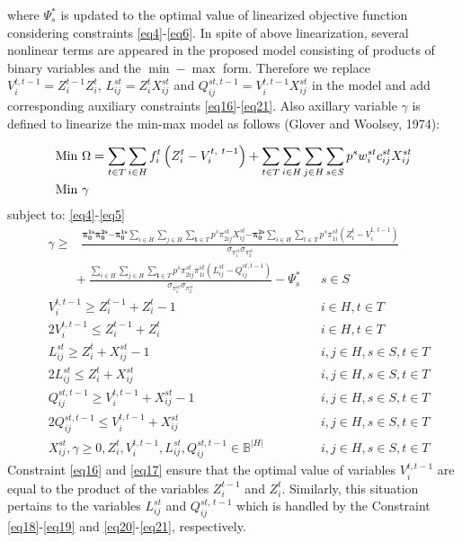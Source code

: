 \documentclass[review]{elsarticle}
\begin{document}
where ${\Psi }^*_s$ is updated to the optimal value of linearized objective function considering constraints \eqref{eq4}-\eqref{eq6}. In spite of above linearization, several nonlinear terms are appeared in the proposed model consisting of products of binary variables and the $\min -\max$ form. Therefore we replace $V_{i}^{t,t-1} =Z_{i}^{t-1} Z_{i}^{t}$, $L_{ij}^{st} =Z_{i}^{t} X_{ij}^{st}$ and $Q_{ij}^{st, t-1} =V_{i}^{t ,t-1} X_{ij}^{st}$ in the model and add corresponding auxiliary constraints \eqref{eq16}-\eqref{eq21}. Also axillary variable $\gamma $ is defined to linearize the min-max model as follows (Glover and Woolsey, 1974):

\begin{align}
&{\rm Min}\ \Omega =\sum_{t\in T}{\sum_{i\in H}{f^t_i\left(Z^t_i-V^{t,\ t-1}_i\right)}}+\sum_{t\in T}\sum_{i\in H}{\sum_{j\in H}{\sum_{s\in S}{p^sw^{st}_i c^{st}_{ij}X^{st}_{ij}}}}\label{eq13}\\
&{\rm Min}~\gamma \label{eq14}
\end{align}
subject  to: \eqref{eq4}-\eqref{eq5}
\begin{align}
\gamma \geq & \frac{{\mathbf{ \pi }}^{\mathbf{ 1}\mathbf{ s}}_{\mathbf{ 0}}{\mathbf{ \pi }}^{\mathbf{ 2}\mathbf{ s}}_{\mathbf{ 0}}\mathbf{ -}{\mathbf{ \pi }}^{\mathbf{ 1}\mathbf{ s}}_{\mathbf{ 0}}\sum_{i\in H}{\sum_{j\in H}{\sum_{\mathbf{ t}\in T}{p^s{\pi }^{st}_{2ij}X^{st}_{ij}}}}\mathbf{ -}{\mathbf{ \pi }}^{\mathbf{ 2}\mathbf{ s}}_{\mathbf{ 0}}\sum_{i\in H}{\sum_{t\in T}{p^s{\pi }^{st}_{1i}\left(Z^t_i-V^{t,\ t-1}_i\right)}}}{{\sigma }_{{\pi }^{st}_{1}}{\sigma }_{{\pi }^{st}_{2}}}&&\nonumber
\end{align}
\begin{align}
&\qquad+\frac{\sum_{i\in H}{\sum_{j\in H}{\sum_{\mathbf{ t}\in T}{p^s{\pi }^{st}_{2ij}{\pi }^{st}_{1i}(L^{st}_{ij}-Q^{st,t-1}_{ij})}}}}{{\sigma }_{{\pi }^{st}_{1}}{\sigma }_{{\pi }^{st}_{2}}}-{\Psi }^*_s &&s\in S\label{eq15}\\
&V^{t,t-1}_i\geq Z^{t-1}_i+Z^t_i-1&& i\in H, t\in T\label{eq16}\\
&2V^{t,t-1}_i\leq Z^{t-1}_i+Z^t_i&& i\in H, t\in T\label{eq17}\\
&L^{st}_{ij}\geq Z^t_i+X^{st}_{ij}-1&&i,j\in H, s\in S, t\in T\label{eq18}\\
&2L^{st}_{ij}\leq Z^t_i+X^{st}_{ij}&&i,j\in H, s\in S, t\in T\label{eq19}\\
&Q^{st,t-1}_{ij}\geq V^{t,t-1}_i+X^{st}_{ij}-1&&i,j\in H, s\in S, t\in T\label{eq20}\\
&2Q^{st,t-1}_{ij}\leq V^{t,t-1}_i+X^{st}_{ij}&&i,j\in H, s\in S, t\in T\label{eq21}\\
&X^{st}_{ij},\gamma \geq 0, Z^t_i,V^{t,t-1}_i,L^{st}_{ij},Q^{st,t-1}_{ij}\in
\mathbb{ B}^{\left|H\right|}&&i,j\in H, s\in S, t\in T\label{eq22}
\end{align} 
Constraint \eqref{eq16} and \eqref{eq17} ensure that the optimal value of variables $V_{i}^{t,t-1} $ are equal to the product of the variables $Z_{i}^{t-1} $ and $Z_{i}^{t} $. Similarly, this situation pertains to the variables $L_{ij}^{st} $ and $Q_{ij}^{st,\, t-1} $ which is handled by the Constraint \eqref{eq18}-\eqref{eq19} and \eqref{eq20}-\eqref{eq21}, respectively.
\end{document}
